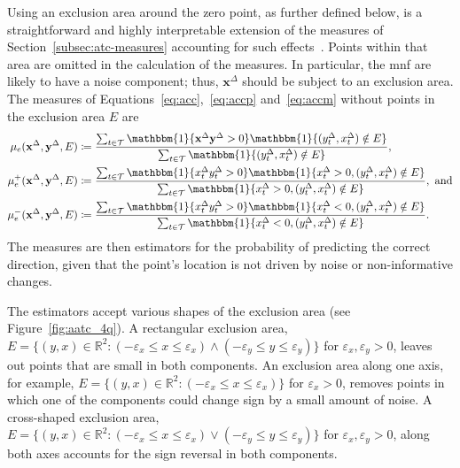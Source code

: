 \documentclass[pdflatex]{sn-jnl}
\theoremstyle{plain}%
\theoremstyle{definition}
\newcommand{\ind}[1]{\mathbbm{1}\{#1\}}
\newcommand{\R}{\mathbb{R}}
\newcommand{\diffx}{\mathbf{x}^{\Delta}}
\newcommand{\diffy}{\mathbf{y}^{\Delta}}
\newcommand{\diffxt}[1][t]{x^{\Delta}_{#1}}
\newcommand{\diffyt}[1][t]{y^{\Delta}_{#1}}
\newcommand{\acc}{\mu}
\newcommand{\acceps}[1][e]{\acc_{#1}} %
\newcommand{\accpeps}[1][e]{\acceps[#1]^+}
\newcommand{\accmeps}[1][e]{\acceps[#1]^-}
\begin{document}
Using an exclusion area around the zero point, as further defined below, is a straightforward and highly interpretable extension of the measures of Section~\ref{subsec:atc-measures} accounting for such effects~\citep[see, e.g.,][]{Saugel2015, Critchley2010}.
Points within that area are omitted in the calculation of the measures.
In particular, the \ac{mnf} are likely to have a noise component; thus, $\diffx$ should be subject to an exclusion area.
The measures of Equations~\eqref{eq:acc},~\eqref{eq:accp} and~\eqref{eq:accm} without points in the exclusion area $E$ are
\begin{align}
    \acceps (\diffx, \diffy, E) &\coloneqq \frac{\sum_{t \in \mathcal{T}} \ind{\diffx \diffy > 0} \ind{(\diffyt, \diffxt) \notin E}}{\sum_{t \in \mathcal{T}} \ind{(\diffyt, \diffxt) \notin E}},\label{eq:acceps}\\
    \accpeps (\diffx, \diffy, E) &\coloneqq \frac{\sum_{t \in \mathcal{T}} \ind{\diffxt \diffyt > 0} \ind{\diffxt > 0, (\diffyt, \diffxt) \notin E}}{\sum_{t \in \mathcal{T}} \ind{\diffxt > 0, (\diffyt, \diffxt) \notin E}}, \ \text{and} \label{eq:accpeps}\\
    \accmeps (\diffx, \diffy, E) &\coloneqq \frac{\sum_{t \in \mathcal{T}} \ind{\diffxt \diffyt > 0} \ind{\diffxt < 0, (\diffyt, \diffxt) \notin E}}{\sum_{t \in \mathcal{T}} \ind{\diffxt < 0, (\diffyt, \diffxt) \notin E}}. \label{eq:accmeps}
\end{align}
The measures are then estimators for the probability of predicting the correct direction, given that the point's location is not driven by noise or non-informative changes.

The estimators accept various shapes of the exclusion area (see Figure~\ref{fig:aatc_4q}).
A rectangular exclusion area, $E = \{(y, x) \in \R^2: (-\varepsilon_x \leq x \leq \varepsilon_x) \land (-\varepsilon_y \leq y \leq \varepsilon_y) \}$ for $\varepsilon_x, \varepsilon_y > 0$, leaves out points that are small in both components.
An exclusion area along one axis, for example, $E = \{(y, x) \in \R^2: (-\varepsilon_x \leq x \leq \varepsilon_x)\}$ for $\varepsilon_x > 0$, removes points in which one of the components could change sign by a small amount of noise.
A cross-shaped exclusion area, $E = \{(y, x) \in \R^2: (-\varepsilon_x \leq x \leq \varepsilon_x) \lor (-\varepsilon_y \leq y \leq \varepsilon_y) \}$ for $\varepsilon_x, \varepsilon_y > 0$, along both axes accounts for the sign reversal in both components.
\end{document}

